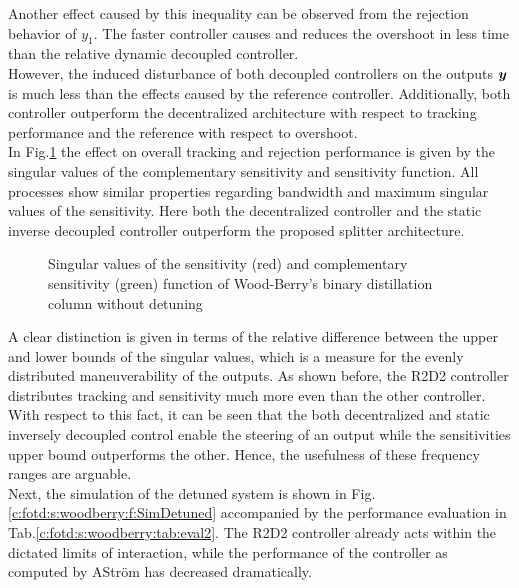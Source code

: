 Another effect caused by this inequality can be observed from the rejection behavior of $y_1$. The faster controller causes and reduces the overshoot in less time than the relative dynamic decoupled controller.\\

However, the induced disturbance of both decoupled controllers on the outputs $\mbox{\boldmath$y$}$ is much less than the effects caused by the reference controller.  Additionally, both controller outperform the decentralized architecture with respect to tracking performance and the reference with respect to overshoot.\\


In Fig.\ref{c:fotd:s:woodberry:f:SingValNotDetuned} the effect on overall tracking and rejection performance is given by the singular values of the complementary sensitivity and sensitivity function. All processes show similar properties regarding bandwidth and maximum singular values of the sensitivity. Here both the decentralized controller and the static inverse decoupled controller outperform the proposed splitter architecture.

\begin{figure}[H]\centering

\caption{Singular values of the sensitivity (red) and complementary sensitivity (green) function of Wood-Berry's binary distillation column without detuning}
\label{c:fotd:s:woodberry:f:SingValNotDetuned}
\end{figure}

A clear distinction is given in terms of the relative difference between the upper and lower bounds of the singular values, which is a measure for the evenly distributed maneuverability of the outputs. As shown before, the R2D2 controller distributes tracking and sensitivity much more even than the other controller. With respect to this fact, it can be seen that the both decentralized and static inversely decoupled control enable the steering of an output while the sensitivities upper bound outperforms the other. Hence, the usefulness of these frequency ranges are arguable.\\

Next, the simulation of the detuned system is shown in Fig.\ref{c:fotd:s:woodberry:f:SimDetuned} accompanied by the performance evaluation in Tab.\ref{c:fotd:s:woodberry:tab:eval2}. The R2D2 controller already acts within the dictated limits of interaction, while the performance of the controller as computed by AStr\"om has decreased dramatically.

